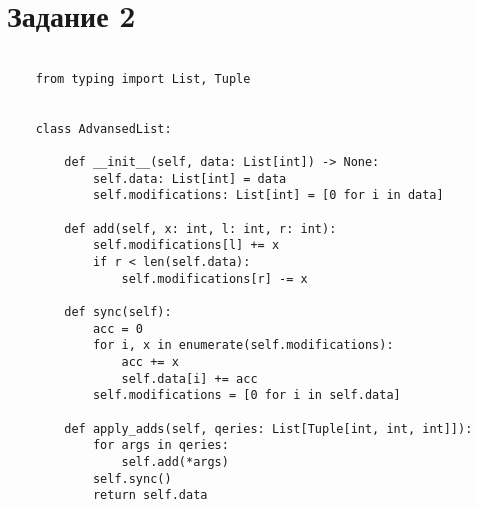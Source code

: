 
\section*{Задание 2}


\begin{lstlisting}

	from typing import List, Tuple


	class AdvansedList:
	
		def __init__(self, data: List[int]) -> None:
			self.data: List[int] = data
			self.modifications: List[int] = [0 for i in data]
	
		def add(self, x: int, l: int, r: int):
			self.modifications[l] += x
			if r < len(self.data):
				self.modifications[r] -= x
	
		def sync(self):
			acc = 0
			for i, x in enumerate(self.modifications):
				acc += x
				self.data[i] += acc
			self.modifications = [0 for i in self.data]
	
		def apply_adds(self, qeries: List[Tuple[int, int, int]]):
			for args in qeries:
				self.add(*args)
			self.sync()
			return self.data
\end{lstlisting}

